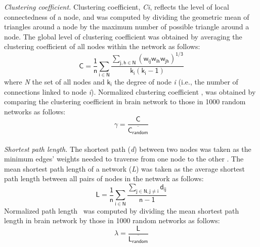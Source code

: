 \begin{refsection}
\noindent
\textit{Clustering coefficient.} Clustering coefficient, \textit{Ci}, reflects the level of local connectedness of a node, and was computed by dividing the geometric mean of triangles around a node by the maximum number of possible triangle around a node. The global level of clustering coefficient was obtained by averaging the clustering coefficient of all nodes within the network as follows:
\[\mathsf{C=\frac{1}{n}\sum_{i \in N} \frac{\sum_{j,h \in N} (w_{ij}w_{ih}w_{jh})^{1/3}}{k_{i}(k_{i}-1)}}\]
where \textit{N} the set of all nodes and $\mathsf{k_{i}}$ the degree of node \textit{i} (i.e., the number of connections linked to node \textit{i}). Normalized clustering coefficient \textgamma, was obtained by comparing the clustering coefficient in brain network to those in 1000 random networks as follows:
\[\mathsf{\gamma=\frac{C}{\overline{C_{random}}}} \]   \\

\noindent
\textit{Shortest path length.} The shortest path (\textit{d}) between two nodes was taken as the minimum edges' weights needed to traverse from one node to the other \citep{RUBINOV20101059}. The mean shortest path length of a network (\textit{L}) was taken as the average shortest path length between all pairs of nodes in the network as follows:
\[\mathsf{L=\frac{1}{n} \sum_{i \in N} {\frac{\sum_{j \in N,j \neq i} {d_{ij}}}{n-1}}}\]
Normalized path length \textlambda \ was computed by dividing the mean shortest path length in brain network by those in 1000 random networks as follows:
\[\mathsf{\lambda=\frac{L}{\overline{L_{random}}} }\] \\


\end{refsection}
